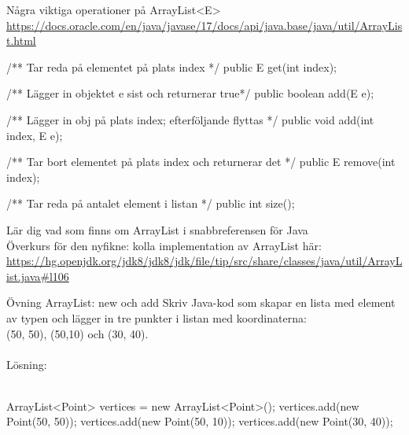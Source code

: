 \begin{Slide}{Några viktiga operationer på ArrayList<E>}
\SlideFontTiny\url{https://docs.oracle.com/en/java/javase/17/docs/api/java.base/java/util/ArrayList.html}
\begin{Code}[numberstyle=,language=Java]
/** Tar reda på elementet på plats index */
public E get(int index);

/** Lägger in objektet e sist och returnerar true*/
public boolean add(E e);

/** Lägger in obj på plats index; efterföljande flyttas */
public void add(int index, E e);

/** Tar bort elementet på plats index och returnerar det */
public E remove(int index);

/** Tar reda på antalet element i listan */
public int size();
\end{Code}
Lär dig vad som finns om ArrayList i snabbreferensen för Java\\
Överkurs för den nyfikne: kolla implementation av ArrayList här: \\ \url{https://hg.openjdk.org/jdk8/jdk8/jdk/file/tip/src/share/classes/java/util/ArrayList.java#l106}
\end{Slide}


\begin{Slide}{Övning ArrayList: new och add}
Skriv Java-kod som skapar en lista med element av typen  och lägger in tre punkter i listan med koordinaterna:\\ (50, 50), (50,10) och (30, 40).
\pause
~\\~\\ Lösning: \ifkompendium\else\\~\\\fi
\begin{Code}[numberstyle=,language=Java]
ArrayList<Point> vertices = new ArrayList<Point>();
vertices.add(new Point(50, 50));
vertices.add(new Point(50, 10));
vertices.add(new Point(30, 40));
\end{Code}
\end{Slide}


